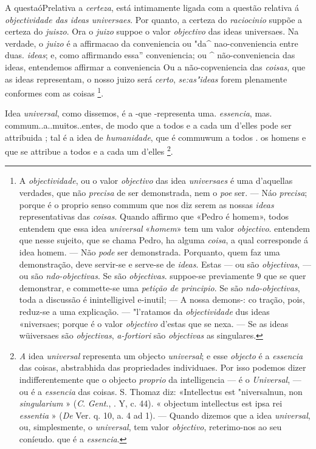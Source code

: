 A questaóPrelativa a \emph{certeza}, está intimamente ligada com a questão relativa á \emph{objectividade das ideas universaes}. Por quanto, a certeza do \emph{raciocinio} suppõe a certeza do \emph{juiszo}. Ora o \emph{juizo} suppoe o valor \emph{objectivo} das ideas universaes. Na verdade, o \emph{juizo} é a affirmacao da conveniencia ou "da\textasciicircum{} nao-conveniencia entre duas. \emph{ideas}; e, como affirmando essa” conveniencia; ou \textasciicircum{} não-conveniencia das ideas, entendemos affirmar a conveniencia Ou a não-copveniencia   das \emph{coisas}, que as ideas representam, o nosso juizo será \emph{certo}, \emph{se:as"ideas} forem plenamente conformes com as coisas \footnote{A \emph{objectividade}, ou o valor \emph{objectivo} das idea \emph{universaes} é uma d'aquellas verdades, que não \emph{precisa} de ser demonstrada, nem o \emph{poe} ser. --- Náo \emph{precisa}; porque é o proprio senso commum que nos diz serem as nossas \emph{ideas} representativas das \emph{coisas}. Quando affirmo que «Pedro é homem», todos entendem que essa idea \emph{universal} «\emph{homem}» tem um valor \emph{objectivo}. entendem que nesse sujeito, que se chama Pedro, ha alguma \emph{coisa}, a qual corresponde á idea homem. --- Não \emph{pode} ser demonstrada. Porquanto, quem faz uma demonstração, deve servir-se e serve-se de \emph{ideas}. Estas --- ou são \emph{objectivas}, --- ou são \emph{ndo-objectivas}. Se são \emph{objectivas}. suppoe-se previamente 9 que se quer demonstrar, e commette-se uma \emph{petição de principio}. Se são \emph{ndo-objectivas}, toda a discussão é inintelligivel e-inutil; --- A nossa demons-: co tração, pois, reduz-se a uma explicação. --- "l'ratamos da \emph{objectividade} dus ideas «niversaes; porque é o valor \emph{objectivo} d'estas que se nexa. --- Se as ideas wüiversaes são \emph{objectivas}, \emph{a-fortiori} são \emph{objectivas} as singulares.}.


Idea \emph{universal}, como dissemos, é a -que -representa uma. \emph{essencia}, mas. commum..a..muitos..entes, de modo que a todos e a cada um d'elles pode ser attribuida ; tal é a idea de \emph{humanidade}, que é commuwum a todos . os homens e que se attribue a todos e a cada um d'elles \footnote{\emph{A} idea \emph{universal} representa um objecto \emph{universal}; e esse \emph{objecto} é a \emph{essencia} das coisas, abstrabhida das propriedades individuaes. Por isso podemos dizer indifferentemente que o objecto \emph{proprio} da intelligencia --- é o \emph{Universal}, --- ou é a \emph{essencia} das coisas. S. Thomaz diz: «Intellectus est "niversalnun, non \emph{singularium} » (\emph{C}. \emph{Gent}., \textbar{}. Y, c. 44). « objectum intellectus est ipsa rei \emph{essentia} » (\emph{De} Ver. q. 10, a. 4 ad 1). --- Quando dizemos que a idea \emph{universal}, ou, simplesmente, o \emph{universal}, tem valor \emph{objectivo}, reterimo-nos ao seu coníeudo. que é a \emph{essencia}.}.

